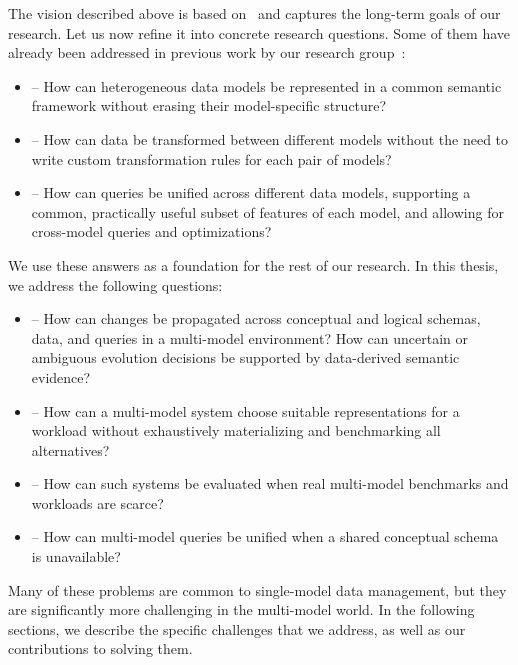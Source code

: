 The vision described above is based on~ and captures the long-term goals of our research. Let us now refine it into concrete research questions. Some of them have already been addressed in previous work by our research group~\citep{mm_cat, mm_cat_journal, mm_quecat, koupil2023universal}:
\begin{itemize}
    \item {} -- How can heterogeneous data models be represented in a common semantic framework without erasing their model-specific structure?
    \item {} -- How can data be transformed between different models without the need to write custom transformation rules for each pair of models?
    \item {} -- How can queries be unified across different data models, supporting a common, practically useful subset of features of each model, and allowing for cross-model queries and optimizations?
\end{itemize}
We use these answers as a foundation for the rest of our research. In this thesis, we address the following questions:
\begin{itemize}
    \item {} -- How can changes be propagated across conceptual and logical schemas, data, and queries in a multi-model environment? How can uncertain or ambiguous evolution decisions be supported by data-derived semantic evidence?
    \item {} -- How can a multi-model system choose suitable representations for a workload without exhaustively materializing and benchmarking all alternatives?
    \item {} -- How can such systems be evaluated when real multi-model benchmarks and workloads are scarce?
    \item {} -- How can multi-model queries be unified when a shared conceptual schema is unavailable?
\end{itemize}
Many of these problems are common to single-model data management, but they are significantly more challenging in the multi-model world. In the following sections, we describe the specific challenges that we address, as well as our contributions to solving them.
